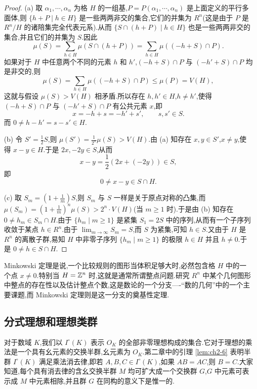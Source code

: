 \begin{proof}
(a) 取 $\alpha_1,\cdots,\alpha_n$ 为格 $H$ 的一组基,$P=P(\alpha_1,\cdots,\alpha_n)$ 是上面定义的平行多面体,则 $\{h+P\mid h\in H\}$ 是一些两两非交的集合,它们的并集为 $R^n$(这是由于 $P$ 是 $R^n/H$ 的诸陪集完全代表元系).从而 $\{S\cap(h+P)\mid h\in H\}$ 也是一些两两非交的集合,并且它们的并集为 $S$.因此
\[
  \mu(S)=\sum_{h\in H}\mu(S\cap(h+P))=\sum_{h\in H}\mu((-h+S)\cap P).
\]
如果对于 $H$ 中任意两个不同的元素 $h$ 和 $h'$,$(-h+S)\cap P$ 与 $(-h'+S)\cap P$ 均是非交的,则
\[
  \mu(S)=\sum_{h\in H}\mu((-h+S)\cap P)\leqslant\mu(P)=V(H),
\]
这就与假设 $\mu(S)>V(H)$ 相矛盾.所以存在 $h,h'\in H$,$h\neq h'$,使得 $(-h+S)\cap P$ 与 $(-h'+S)\cap P$ 有公共元素 $x$,即
\[
  x=-h+s=-h'+s',\qquad s,s'\in S.
\]
而 $0\neq h-h'=s-s'\in H$.

(b) 令 $S'=\frac{1}{2}S$,则 $\mu(S')=\frac{1}{2^n}\mu(S)>V(H)$.由 (a) 知存在 $x,y\in S'$,$x\neq y$,使得 $x-y\in H$.于是 $2x,-2y\in S$,从而
\[
  x-y=\frac{1}{2}(2x+(-2y))\in S,
\]
即
\[
  0\neq x-y\in S\cap H.
\]

(c) 取 $S_m=\left(1+\frac{1}{m}\right)S$,则 $S_m$ 与 $S$ 一样是关于原点对称的凸集,而 $\mu(S_m)=\left(1+\frac{1}{m}\right)^n\mu(S)>2^n\cdot V(H)$(当 $m\geqslant 1$ 时).于是由 (b) 知存在 $0\neq h_m\in S_m\cap H$.由于 $\{h_m\mid m\geqslant 1\}$ 是紧集 $S_1=2S$ 中的序列,从而有一个子序列收敛于某点 $h\in R^n$.由于 $\lim_{m\to\infty}S_m=S$,而 $S$ 为紧集,可知 $h\in S$.又由于 $H$ 是 $R^n$ 的离散子群,易知 $H$ 中非零子序列 $\{h_m\mid m\geqslant 1\}$ 的极限 $h\in H$ 并且 $h\neq 0$.于是 $0\neq h\in S\cap H$.
\end{proof}

\begin{remark}
Minkowski 定理是说,一个比较规则的图形当体积足够大时,必然包含格 $H$ 中的一个点 $x\neq 0$.特别当 $H=\mathbb{Z}^n$ 时,这就是通常所谓整点问题.研究 $R^n$ 中某个几何图形中整点的存在性以及估计整点个数,这是数论的一个分支----``数的几何''中的一个主要课题,而 Minkowski 定理则是这一分支的奠基性定理.
\end{remark}

\subsection{分式理想和理想类群}\label{sec:ch3-s1-2}

\begin{sloppypar}
对于数域 $K$,我们以 $I^{\circ}(K)$ 表示 $O_K$ 的全部非零理想构成的集合.它对于理想的乘法是一个具有幺元素的交换半群,幺元素为 $O_K$.第二章中的引理 \ref{lem:ch2-6} 表明半群 $I^{\circ}(K)$ 满足乘法消去律,即若 $A,B,C\in I^{\circ}(K)$,如果 $AB=AC$,则 $B=C$.大家知道,每个具有消去律的含幺交换半群 $M$ 均可扩大成一个交换群 $G$,$G$ 中元素可表示成 $M$ 中元素相除,并且群 $G$ 在同构的意义下是惟一的.
\end{sloppypar}

